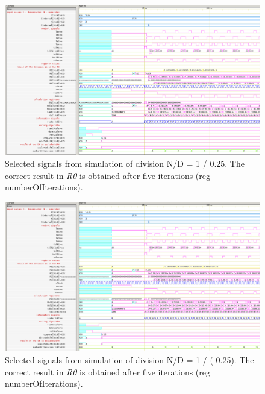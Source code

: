 \documentclass[a4paper, twoside, 11pt]{article}
\begin{document}
\begin{figure}[htbp!]
  \centering
  \includegraphics[width=1\textwidth]{src/png/inverted/division-1-div-0-25.png}
   \caption{Selected signals from simulation of division N/D = 1 / 0.25. The correct result in \textit{R0} is obtained after five iterations (reg numberOfIterations).}
  \label{fig:division-1-div-0-25}
\end{figure}

\begin{figure}[htbp!]
  \centering
  \includegraphics[width=1\textwidth]{src/png/inverted/division-1-div-minus-0-25.png}
    \caption{Selected signals from simulation of division N/D = 1 / (-0.25). The correct result in \textit{R0} is obtained after five iterations (reg numberOfIterations).}
  \label{fig:division-1-div-minus-0-25}
\end{figure}
\end{document}
